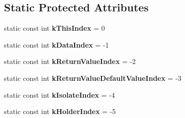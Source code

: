 \subsection*{Static Protected Attributes}
\begin{DoxyCompactItemize}
\item 
\hypertarget{classv8_1_1_property_callback_info_a715d28b9c57a581de1698673c9b9eb8a}{}static const int {\bfseries k\+This\+Index} = 0\label{classv8_1_1_property_callback_info_a715d28b9c57a581de1698673c9b9eb8a}

\item 
\hypertarget{classv8_1_1_property_callback_info_a39fc5d6aaccb2916af503c7120ab99c5}{}static const int {\bfseries k\+Data\+Index} = -\/1\label{classv8_1_1_property_callback_info_a39fc5d6aaccb2916af503c7120ab99c5}

\item 
\hypertarget{classv8_1_1_property_callback_info_ae16cdf2c6ce787b21d94953cd514ed0e}{}static const int {\bfseries k\+Return\+Value\+Index} = -\/2\label{classv8_1_1_property_callback_info_ae16cdf2c6ce787b21d94953cd514ed0e}

\item 
\hypertarget{classv8_1_1_property_callback_info_a00849f770023891d1466176f5e0c8539}{}static const int {\bfseries k\+Return\+Value\+Default\+Value\+Index} = -\/3\label{classv8_1_1_property_callback_info_a00849f770023891d1466176f5e0c8539}

\item 
\hypertarget{classv8_1_1_property_callback_info_a59ba899cb580bc5e8adca6f799db3e2a}{}static const int {\bfseries k\+Isolate\+Index} = -\/4\label{classv8_1_1_property_callback_info_a59ba899cb580bc5e8adca6f799db3e2a}

\item 
\hypertarget{classv8_1_1_property_callback_info_a8598985473483dfadba4e4c67251675b}{}static const int {\bfseries k\+Holder\+Index} = -\/5\label{classv8_1_1_property_callback_info_a8598985473483dfadba4e4c67251675b}

\end{DoxyCompactItemize}
